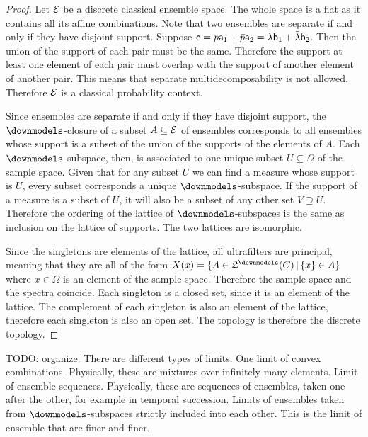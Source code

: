 \begin{proof}
	Let $\Ens$ be a discrete classical ensemble space. The whole space is a flat as it contains all its affine combinations. Note that two ensembles are separate if and only if they have disjoint support. Suppose $\ens = p \ens[a]_1 + \bar{p} \ens[a]_2 = \lambda \ens[b]_1 + \bar{\lambda} \ens[b]_2$. Then the union of the support of each pair must be the same. Therefore the support at least one element of each pair must overlap with the support of another element of another pair. This means that separate multidecomposability is not allowed. Therefore $\Ens$ is a classical probability context.
	
	Since ensembles are separate if and only if they have disjoint support, the $\separate$-closure of a subset $A \subseteq \Ens$ of ensembles corresponds to all ensembles whose support is a subset of the union of the supports of the elements of $A$. Each $\separate$-subspace, then, is associated to one unique subset $U \subseteq \Omega$ of the sample space. Given that for any subset $U$ we can find a measure whose support is $U$, every subset corresponds a unique $\separate$-subspace. If the support of a measure is a subset of $U$, it will also be a subset of any other set $V \supseteq U$. Therefore the ordering of the lattice of $\separate$-subspaces is the same as inclusion on the lattice of supports. The two lattices are isomorphic.
	
	Since the singletons are elements of the lattice, all ultrafilters are principal, meaning that they are all of the form $X(x) = \{A \in \mathfrak{L}^\separate(C) \, | \, \{x\} \in A\}$ where $x \in \Omega$ is an element of the sample space. Therefore the sample space and the spectra coincide. Each singleton is a closed set, since it is an element of the lattice. The complement of each singleton is also an element of the lattice, therefore each singleton is also an open set. The topology is therefore the discrete topology.
\end{proof}

\begin{remark}
	TODO: organize. There are different types of limits. One limit of convex combinations. Physically, these are mixtures over infinitely many elements. Limit of ensemble sequences. Physically, these are sequences of ensembles, taken one after the other, for example in temporal succession. Limits of ensembles taken from $\separate$-subspaces strictly included into each other. This is the limit of ensemble that are finer and finer.
\end{remark}

